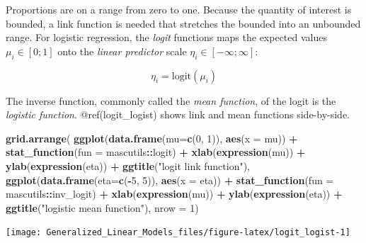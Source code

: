\documentclass[]{svmono}
\newenvironment{Shaded}{\begin{snugshade}}{\end{snugshade}}
\newcommand{\KeywordTok}[1]{\textcolor[rgb]{0.13,0.29,0.53}{\textbf{#1}}}
\newcommand{\DataTypeTok}[1]{\textcolor[rgb]{0.13,0.29,0.53}{#1}}
\newcommand{\DecValTok}[1]{\textcolor[rgb]{0.00,0.00,0.81}{#1}}
\newcommand{\StringTok}[1]{\textcolor[rgb]{0.31,0.60,0.02}{#1}}
\newcommand{\OperatorTok}[1]{\textcolor[rgb]{0.81,0.36,0.00}{\textbf{#1}}}
\newcommand{\NormalTok}[1]{#1}
\begin{document}
Proportions are on a range from zero to one. Because the quantity of
interest is bounded, a link function is needed that stretches the
bounded into an unbounded range. For logistic regression, the
\emph{logit} functions maps the expected values \(\mu_i \in [0;1]\) onto
the \emph{linear predictor} scale \(\eta_i \in [-\infty; \infty]\):

\[
\eta_i = \textrm{logit}(\mu_i)
\]

The inverse function, commonly called the \emph{mean function}, of the
logit is the \emph{logistic function}. @ref(logit\_logist) shows link
and mean functions side-by-side.

\begin{Shaded}
\begin{Highlighting}[]
\KeywordTok{grid.arrange}\NormalTok{(}
  \KeywordTok{ggplot}\NormalTok{(}\KeywordTok{data.frame}\NormalTok{(}\DataTypeTok{mu=}\KeywordTok{c}\NormalTok{(}\DecValTok{0}\NormalTok{, }\DecValTok{1}\NormalTok{)), }\KeywordTok{aes}\NormalTok{(}\DataTypeTok{x =}\NormalTok{ mu)) }\OperatorTok{+}\StringTok{ }
\StringTok{    }\KeywordTok{stat_function}\NormalTok{(}\DataTypeTok{fun =}\NormalTok{ mascutils}\OperatorTok{::}\NormalTok{logit) }\OperatorTok{+}
\StringTok{    }\KeywordTok{xlab}\NormalTok{(}\KeywordTok{expression}\NormalTok{(mu)) }\OperatorTok{+}\StringTok{ }\KeywordTok{ylab}\NormalTok{(}\KeywordTok{expression}\NormalTok{(eta)) }\OperatorTok{+}
\StringTok{    }\KeywordTok{ggtitle}\NormalTok{(}\StringTok{"logit link function"}\NormalTok{),}
  \KeywordTok{ggplot}\NormalTok{(}\KeywordTok{data.frame}\NormalTok{(}\DataTypeTok{eta=}\KeywordTok{c}\NormalTok{(}\OperatorTok{-}\DecValTok{5}\NormalTok{, }\DecValTok{5}\NormalTok{)), }\KeywordTok{aes}\NormalTok{(}\DataTypeTok{x =}\NormalTok{ eta)) }\OperatorTok{+}\StringTok{ }
\StringTok{    }\KeywordTok{stat_function}\NormalTok{(}\DataTypeTok{fun =}\NormalTok{ mascutils}\OperatorTok{::}\NormalTok{inv_logit) }\OperatorTok{+}\StringTok{ }
\StringTok{    }\KeywordTok{xlab}\NormalTok{(}\KeywordTok{expression}\NormalTok{(mu)) }\OperatorTok{+}\StringTok{ }\KeywordTok{ylab}\NormalTok{(}\KeywordTok{expression}\NormalTok{(eta)) }\OperatorTok{+}
\StringTok{    }\KeywordTok{ggtitle}\NormalTok{(}\StringTok{"logistic mean function"}\NormalTok{),}
  \DataTypeTok{nrow =} \DecValTok{1}\NormalTok{)}
\end{Highlighting}
\end{Shaded}

\texttt{[image: Generalized\_Linear\_Models\_files/figure-latex/logit\_logist-1]}
\end{document}

